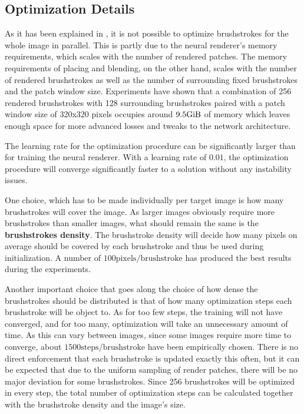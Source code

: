 \subsection{Optimization Details}

As it has been explained in , it is not possible to optimize brushstrokes for the whole image in parallel.
This is partly due to the neural renderer's memory requirements, which scales with the number of rendered patches.
The memory requirements of placing and blending, on the other hand, scales with the number of rendered brushstrokes as well as the number of surrounding fixed brushstrokes and the patch window size.
Experiments have shown that a combination of 256 rendered brushstrokes with 128 surrounding brushstrokes paired with a patch window size of 320x320 pixels occupies around $9.5 \si{\gibi \byte}$ of memory which leaves enough space for more advanced losses and tweaks to the network architecture.

The learning rate for the optimization procedure can be significantly larger than for training the neural renderer.
With a learning rate of $0.01$, the optimization procedure will converge significantly faster to a solution without any instability issues.

One choice, which has to be made individually per target image is how many brushstrokes will cover the image.
As larger images obviously require more brushstrokes than smaller images, what should remain the same is the \textbf{brushstrokes density}.
The brushstroke density will decide how many pixels on average should be covered by each brushstroke and thus be used during initialization.
A number of $100 \text{pixels}/\text{brushstroke}$ has produced the best results during the experiments.

Another important choice that goes along the choice of how dense the brushstrokes should be distributed is that of how many optimization steps each brushstroke will be object to.
As for too few steps, the training will not have converged, and for too many, optimization will take an unnecessary amount of time.
As this can vary between images, since some images require more time to converge, about $1500 \text{steps}/\text{brushstroke}$ have been empirically chosen.
There is no direct enforcement that each brushstroke is updated exactly this often, but it can be expected that due to the uniform sampling of render patches, there will be no major deviation for some brushstrokes.
Since 256 brushstrokes will be optimized in every step, the total number of optimization steps can be calculated together with the brushstroke density and the image's size.

